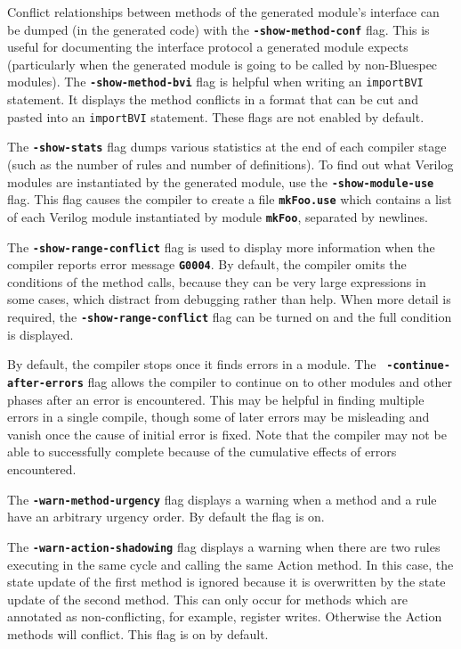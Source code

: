 \documentclass{article}
\newcommand{\te}[1]{\texttt{#1}}
\begin{document}
Conflict relationships between methods of the generated module's
interface can be dumped (in the generated code) with the
{\bf\tt -show-method-conf} flag. This is
useful for documenting the interface protocol a generated module
expects (particularly when the generated module is going to be called
by non-Bluespec modules).  The {\bf\tt -show-method-bvi} flag is
helpful when writing an \te{importBVI} statement.  It displays the
method conflicts in a format that can be cut and pasted into an
\te{importBVI} statement.  These flags are not enabled by default.


The {\bf\tt -show-stats} flag dumps various
statistics at the end of each compiler stage (such as the number of
rules and number of definitions).  To find out what Verilog modules
are instantiated by the generated module, use the {\bf\tt -show-module-use}
flag.  This flag causes the compiler to create a file {\bf\tt mkFoo.use}
which contains a list of each Verilog module instantiated by module
{\bf\tt mkFoo}, separated by newlines.

The {\bf\tt -show-range-conflict} flag is used to display more
information when the compiler reports error message {\bf\tt G0004}.
By default, the compiler omits the conditions of the method calls,
because they can be very large expressions in some cases, which
distract from debugging rather than help.  When more detail is
required, the {\bf\tt -show-range-conflict} flag can be turned on and
the full condition is displayed.

By default, the compiler stops once it finds errors in a module.  The {\bf\tt
-continue-after-errors} flag  allows the compiler to continue on to
other modules and other phases after
an error is encountered.  This may be helpful in finding multiple errors in
a single compile, though some of later  errors
may be misleading and vanish once the cause of initial error is fixed.  Note
that  the compiler may not be able to successfully complete
because of the cumulative effects of  errors encountered.

The {\bf\tt -warn-method-urgency} flag displays a warning when a
method and a rule have an arbitrary urgency order.  By default the
flag is on.

The {\bf\tt -warn-action-shadowing} flag displays a warning when there
are two rules  executing in the same cycle and calling the same Action
method.  In this case,  the state update of the first method is ignored because it is
overwritten by the state update of the second method.  This can only
occur for methods  which are annotated as non-conflicting, for
example,  register writes.  Otherwise the Action methods will
conflict. This flag is on by default.
\end{document}
